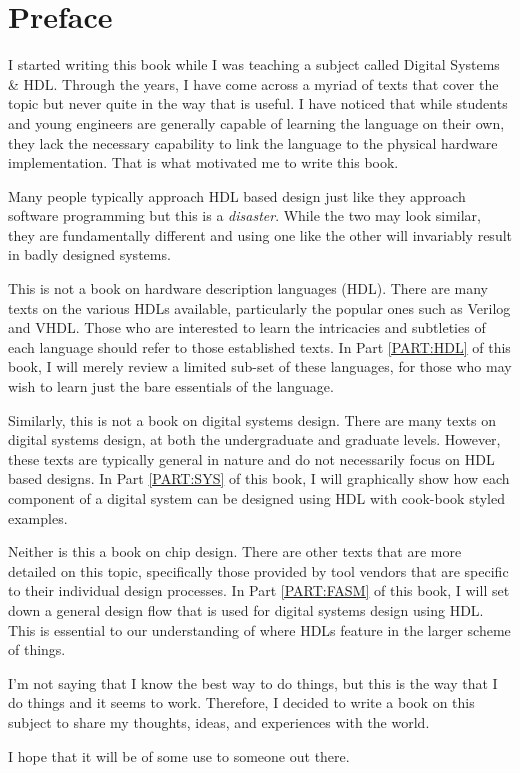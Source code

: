 \chapter*{Preface}

I started writing this book while I was teaching a subject called Digital Systems \& HDL.
Through the years, I have come across a myriad of texts that cover the topic but never quite in the way that is useful.
I have noticed that while students and young engineers are generally capable of learning the language on their own, 
they lack the necessary capability to link the language to the physical hardware implementation.
That is what motivated me to write this book.


Many people typically approach HDL based design just like they approach software programming but this is a \emph{disaster}.
While the two may look similar, they are fundamentally different and using one like the other will invariably result in badly designed systems.

This is not a book on hardware description languages (HDL).
There are many texts on the various HDLs available, particularly the popular ones such as Verilog and VHDL.
Those who are interested to learn the intricacies and subtleties of each language should refer to those established texts.
In Part \ref{PART:HDL} of this book, I will merely review a limited sub-set of these languages, for those who may wish to learn just the bare essentials of the language.

Similarly, this is not a book on digital systems design.
There are many texts on digital systems design, at both the undergraduate and graduate levels.
However, these texts are typically general in nature and do not necessarily focus on HDL based designs.
In Part \ref{PART:SYS} of this book, I will graphically show how each component of a digital system can be designed using HDL with cook-book styled examples.

Neither is this a book on chip design.
There are other texts that are more detailed on this topic, specifically those provided by tool vendors that are specific to their individual design processes.
In Part \ref{PART:FASM} of this book, I will set down a general design flow that is used for digital systems design using HDL.
This is essential to our understanding of where HDLs feature in the larger scheme of things.


I'm not saying that I know the best way to do things, but this is the way that I do things and it seems to work.
Therefore, I decided to write a book on this subject to share my thoughts, ideas, and experiences with the world.

I hope that it will be of some use to someone out there.
